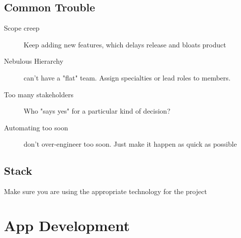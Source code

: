 \documentclass[12pt]{article}
\begin{document}
\subsection{Common Trouble}
\begin{description}
  \item[Scope creep] Keep adding new features, which delays release and bloats
    product
  \item[Nebulous Hierarchy] can't have a "flat" team. Assign specialties or
    lead roles to members.
  \item[Too many stakeholders] Who "says yes" for a particular kind of decision?
  \item[Automating too soon] don't over-engineer too soon. Just make it happen
    as quick as possible
\end{description}

\subsection{Stack}
Make sure you are using the appropriate technology for the project

\section{App Development}
\end{document}
